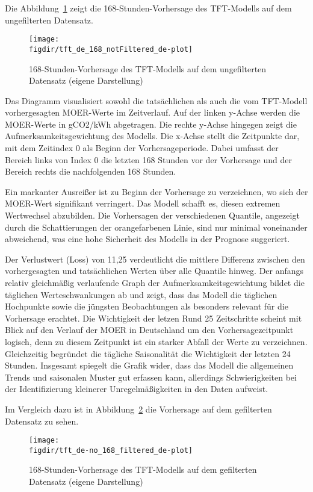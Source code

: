 \noindent Die Abbildung~\ref{FIG:tft-plot} zeigt die 168-Stunden-Vorhersage des \ac{TFT}-Modells auf dem ungefilterten Datensatz.
\begin{figure}
 \caption[TFT 168-Stunden-Vorhersage auf ungefiltertem Datensatz]{168-Stunden-Vorhersage des \ac{TFT}-Modells auf dem ungefilterten Datensatz (eigene Darstellung)}
 {\texttt{[image: \\figdir/tft\_de\_168\_notFiltered\_de-plot]}}
 \label{FIG:tft-plot}
\end{figure}
Das Diagramm visualisiert sowohl die tatsächlichen als auch die vom \ac{TFT}-Modell vorhergesagten \ac{MOER}-Werte im Zeitverlauf.
Auf der linken y-Achse werden die \ac{MOER}-Werte in g\ac{CO2}/kWh abgetragen.
Die rechte y-Achse hingegen zeigt die Aufmerksamkeitsgewichtung des Modells.
Die x-Achse stellt die Zeitpunkte dar, mit dem Zeitindex 0 als Beginn der Vorhersageperiode.
Dabei umfasst der Bereich links von Index 0 die letzten 168 Stunden vor der Vorhersage und der Bereich rechts die nachfolgenden 168 Stunden.

\noindent Ein markanter Ausreißer ist zu Beginn der Vorhersage zu verzeichnen, wo sich der \ac{MOER}-Wert signifikant verringert.
Das Modell schafft es, diesen extremen Wertwechsel abzubilden.
Die Vorhersagen der verschiedenen Quantile, angezeigt durch die Schattierungen der orangefarbenen Linie, sind nur minimal voneinander abweichend, was eine hohe Sicherheit des Modells in der Prognose suggeriert.

Der Verlustwert (Loss) von 11,25 verdeutlicht die mittlere Differenz zwischen den vorhergesagten und tatsächlichen Werten über alle Quantile hinweg.
Der anfangs relativ gleichmäßig verlaufende Graph der Aufmerksamkeitsgewichtung bildet die täglichen Werteschwankungen ab und zeigt, dass das Modell die täglichen Hochpunkte sowie die jüngsten Beobachtungen als besonders relevant für die Vorhersage erachtet.
Die Wichtigkeit der letzen Rund 25 Zeitschritte scheint mit Blick auf den Verlauf der \ac{MOER} in Deutschland um den Vorhersagezeitpunkt logisch, denn zu diesem Zeitpunkt ist ein starker Abfall der Werte zu verzeichnen.
Gleichzeitig begründet die tägliche Saisonalität die Wichtigkeit der letzten 24 Stunden.
Insgesamt spiegelt die Grafik wider, dass das Modell die allgemeinen Trends und saisonalen Muster gut erfassen kann, allerdings Schwierigkeiten bei der Identifizierung kleinerer Unregelmäßigkeiten in den Daten aufweist.

Im Vergleich dazu ist in Abbildung~\ref{FIG:tft-plot-2} die Vorhersage auf dem gefilterten Datensatz zu sehen.
\begin{figure}
 \caption[TFT 168-Stunden-Vorhersage auf gefiltertem Datensatz]{168-Stunden-Vorhersage des \ac{TFT}-Modells auf dem gefilterten Datensatz (eigene Darstellung)}
 {\texttt{[image: \\figdir/tft\_de-no\_168\_filtered\_de-plot]}}
 \label{FIG:tft-plot-2}
\end{figure}

